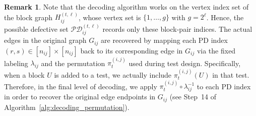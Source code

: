 \documentclass[journal]{IEEEtran}
\theoremstyle{definition}
\newtheorem{remark}{Remark}
\theoremstyle{definition}
\newcommand{\PV}{\nu}
\begin{document}
\begin{remark}
 Note that the decoding algorithm works on the vertex index set of the block graph $H_{ij}^{(t,\ell)}$, whose vertex set is $\{1,\dots,g\}$ with $g = 2^\ell$. Hence, the possible defective set $\mathcal{PD}_{ij}^{(t,\ell)}$ records only these block-pair indices. The actual edges in the original graph $G_{ij}$ are recovered by mapping each PD index $(r,s)\in [n_{ij}]\times[n_{ij}]$ back to its corresponding edge in $G_{ij}$ via the fixed labeling $\lambda_{ij}$ and the permutation $\pi_t^{(i,j)}$ used during test design. Specifically, when a block $U$ is added to a test, we actually include $\pi_t^{(i,j)}(U)$ in that test. Therefore, in the final level of decoding, we apply $\pi_t^{(i,j)} \circ \lambda_{ij}^{-1}$ to each PD index in order to recover the original edge endpoints in $G_{ij}$ (see Step~14 of Algorithm~\ref{alg:decoding_permutation}).

\end{remark}

 



      
\end{document}
